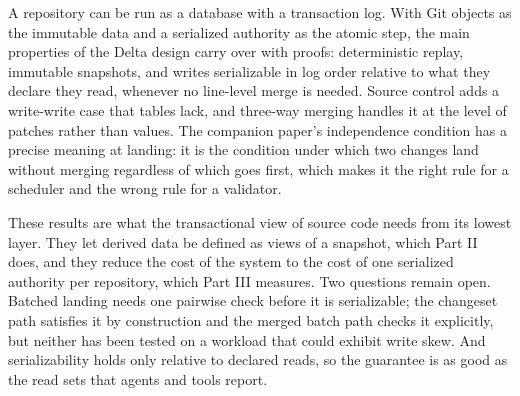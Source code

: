 \documentclass[11pt,letterpaper]{article}
\theoremstyle{definition}
\theoremstyle{remark}
\begin{document}
A repository can be run as a database with a transaction log. With Git objects as the immutable data and a serialized authority as the atomic step, the main properties of the Delta design carry over with proofs: deterministic replay, immutable snapshots, and writes serializable in log order relative to what they declare they read, whenever no line-level merge is needed. Source control adds a write-write case that tables lack, and three-way merging handles it at the level of patches rather than values. The companion paper's independence condition has a precise meaning at landing: it is the condition under which two changes land without merging regardless of which goes first, which makes it the right rule for a scheduler and the wrong rule for a validator.

These results are what the transactional view of source code needs from its lowest layer. They let derived data be defined as views of a snapshot, which Part II does, and they reduce the cost of the system to the cost of one serialized authority per repository, which Part III measures. Two questions remain open. Batched landing needs one pairwise check before it is serializable; the changeset path satisfies it by construction and the merged batch path checks it explicitly, but neither has been tested on a workload that could exhibit write skew. And serializability holds only relative to declared reads, so the guarantee is as good as the read sets that agents and tools report.
\end{document}
